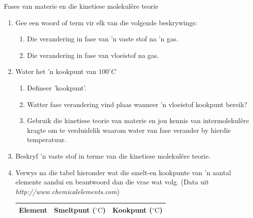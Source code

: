             \begin{eocexercises}{Fases van materie en die kinetiese molekul\^{e}re teorie}
            \nopagebreak \noindent
\label{m38730*id311490}\begin{enumerate}[noitemsep, label=\textbf{\arabic*}. ] 
            \label{m38730*uid87}\item Gee een woord of term vir elk van die volgende beskrywings:
\label{m38730*id311506}\begin{enumerate}[noitemsep, label=\textbf{\alph*}. ] 
            \label{m38730*uid88}\item Die verandering in fase van 'n vaste stof na 'n gas.
\label{m38730*uid89}\item Die verandering in fase van vloeistof na gas.
\end{enumerate}
                \label{m38730*uid103}\item Water het 'n kookpunt van $100 ^{\circ} C$
\label{m38730*id311744}\begin{enumerate}[noitemsep, label=\textbf{\alph*}. ] 
            \label{m38730*uid104}\item Defineer 'kookpunt'.
\label{m38730*uid105}\item Watter fase verandering vind plaas wanneer 'n vloeistof kookpunt bereik?
\label{m38730*uid107}\item Gebruik die kinetiese teorie van materie en jou kennis van intermolekul\^{e}re kragte om te verduidelik waarom water van fase verander by hierdie temperatuur.
\end{enumerate}
\label{m38730*id762}\item Beskryf 'n vaste stof in terme van die kinetiese molekul\^{e}re teorie. \newline
            \label{m38730*uid108}\item Verwys na die tabel hieronder wat die smelt-en kookpunte van 'n aantal elemente aandui en beantwoord dan die vrae wat volg. (Data uit \textsl{http://www.chemicalelements.com})
          \begin{table}[H]
        \begin{center}
      \label{m38730*id311817}
      \begin{tabular}{|l|l|l|}\hline
\textbf{Element} & \textbf{Smeltpunt ($^{\circ} \text{C}$)} & \textbf{Kookpunt ($^{\circ} \text{C}$)} \\ \hline

\end{tabular}
\end{center}
\end{table}
\end{enumerate}
\end{eocexercises}

